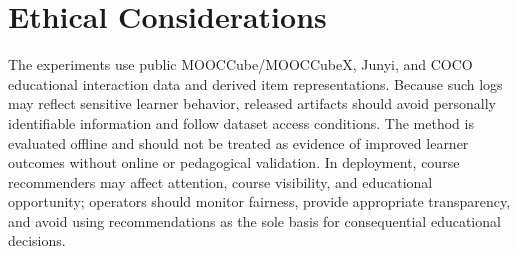 \documentclass[sigconf,anonymous,review]{acmart}
\begin{document}
\section{Ethical Considerations}
The experiments use public MOOCCube/MOOCCubeX, Junyi, and COCO educational interaction data and derived item representations. Because such logs may reflect sensitive learner behavior, released artifacts should avoid personally identifiable information and follow dataset access conditions. The method is evaluated offline and should not be treated as evidence of improved learner outcomes without online or pedagogical validation. In deployment, course recommenders may affect attention, course visibility, and educational opportunity; operators should monitor fairness, provide appropriate transparency, and avoid using recommendations as the sole basis for consequential educational decisions.



\end{document}
